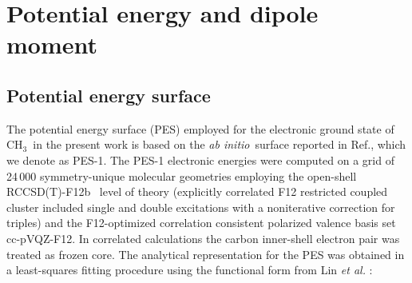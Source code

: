 \documentclass{achemso}
\newcommand{\3}{$_{3}$}
\newcommand{\ai}{\textit{ab initio}}
\begin{document}
\section{Potential energy and dipole moment}

\subsection{Potential energy surface}\label{sec:PES}

The potential energy surface (PES) employed for the electronic ground state of CH\3\ in the present
work is based on the \ai\ surface reported in Ref., which we denote as PES-1. The PES-1
electronic energies were computed on a grid of 24\,000 symmetry-unique molecular geometries employing
the open-shell RCCSD(T)-F12b~\cite{adler07,adler09} level of theory (explicitly correlated F12 restricted
coupled cluster included single and double excitations with a noniterative correction for triples) and the
F12-optimized correlation consistent polarized valence basis set cc-pVQZ-F12.\cite{peterson08} In correlated
calculations the carbon inner-shell electron pair was treated as frozen core. The analytical representation
for the PES was obtained in a least-squares fitting procedure using the functional form from {Lin {\it et al.}
\cite{nh3_02}}:
\end{document}
